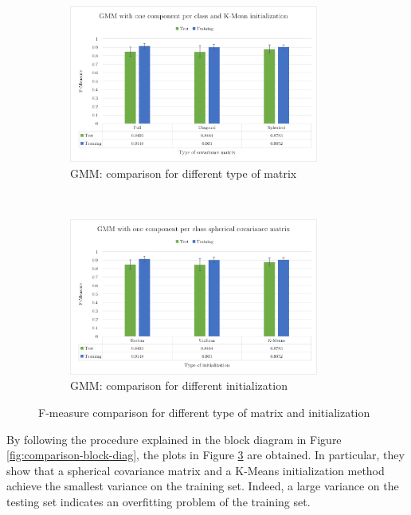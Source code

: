 \documentclass[a4paper,10pt]{article}
\begin{document}
\begin{figure}[H]
\centering
    \begin{subfigure}[t]{0.4\textwidth}
      \centering
      \includegraphics[width=0.9\textwidth]{pictures/GMM_graph_2}
      \caption{GMM: comparison for different type of matrix}
      \label{fig:GMM_graph_2}
     \end{subfigure}
      ~
    \begin{subfigure}[t]{0.4\textwidth}
      \centering
      \includegraphics[width=0.9\textwidth]{pictures/GMM_graph_3}
      \caption{GMM: comparison for different initialization}
      \label{fig:GMM_graph_3}
     \end{subfigure}
\caption{F-measure comparison for different type of matrix and initialization}
\label{fig:GMM_matrix_init}
\end{figure}

By following the procedure explained in the block diagram in Figure \ref{fig:comparison-block-diag}, the plots in Figure \ref{fig:GMM_matrix_init} are obtained. In particular, they show that a spherical covariance matrix and a K-Means initialization method achieve the smallest variance on the training set. Indeed, a large variance on the testing set indicates an overfitting problem of the training set.
\end{document}
